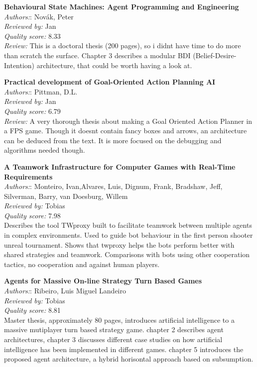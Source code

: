 \textbf{Behavioural State Machines: Agent Programming and Engineering}\\
\textit{Authors:}: Novák, Peter\\
\textit{Reviewed by:} Jan\\
\textit{Quality score:} 8.33\\
\textit{Review:} This is a doctoral thesis (200 pages), so i didnt have time to do more than scratch the surface. Chapter 3 describes a modular BDI (Belief-Desire-Intention) architecture, that could be worth having a look at.


\textbf{Practical development of Goal-Oriented Action Planning AI}\\
\textit{Authors:}: Pittman, D.L.\\
\textit{Reviewed by:} Jan\\
\textit{Quality score:} 6.79\\
\textit{Review:} A very thorough thesis about making a Goal Oriented Action Planner in a FPS game. Though it doesnt contain fancy boxes and arrows, an architecture can be deduced from the text. It is more focused on the debugging and algorithms needed though.

\textbf{A Teamwork Infrastructure for Computer Games with Real-Time Requirements}\\
\textit{Authors:}: Monteiro, Ivan,Alvares, Luis, Dignum, Frank, Bradshaw, Jeff, Silverman, Barry, van Doesburg, Willem\\
\textit{Reviewed by:} Tobias\\
\textit{Quality score:} 7.98\\
Describes the tool TWproxy built to facilitate teamwork between multiple agents in complex environments. Used to guide bot behaviour in the first person shooter unreal tournament. Shows that twproxy helps the bots perform better with shared strategies and teamwork. Comparisons with bots using other cooperation tactics, no cooperation and against human players.

\textbf{Agents for Massive On-line Strategy Turn Based Games}\\
\textit{Authors:}: Ribeiro, Luis Miguel Landeiro\\
\textit{Reviewed by:} Tobias\\
\textit{Quality score:} 8.81\\
Master thesis, approximately 80 pages, introduces artificial intelligence to a massive mutiplayer turn based strategy game. chapter 2 describes agent architectures, chapter 3 discusses different case studies on how artificial intelligence has been implemented in different games. chapter 5 introduces the proposed agent architecture, a hybrid horisontal approach based on subsumption.

